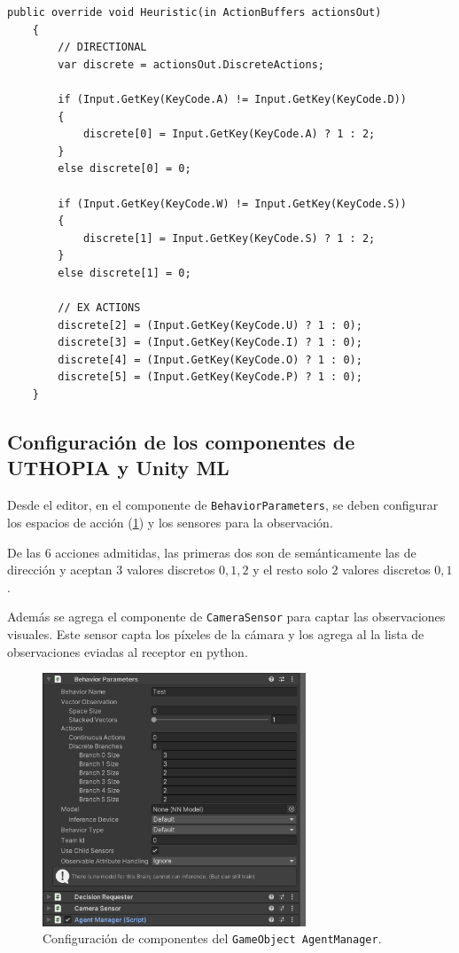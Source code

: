 \begin{lstlisting}[caption={Implementación de la asignación de acciones heurística para captar la entrada de los agentes humanos.}]
    public override void Heuristic(in ActionBuffers actionsOut)
    {
        // DIRECTIONAL
        var discrete = actionsOut.DiscreteActions;
 
        if (Input.GetKey(KeyCode.A) != Input.GetKey(KeyCode.D))
        {
            discrete[0] = Input.GetKey(KeyCode.A) ? 1 : 2;
        }
        else discrete[0] = 0;
 
        if (Input.GetKey(KeyCode.W) != Input.GetKey(KeyCode.S))
        {
            discrete[1] = Input.GetKey(KeyCode.S) ? 1 : 2;
        }
        else discrete[1] = 0;
 
        // EX ACTIONS
        discrete[2] = (Input.GetKey(KeyCode.U) ? 1 : 0);
        discrete[3] = (Input.GetKey(KeyCode.I) ? 1 : 0);
        discrete[4] = (Input.GetKey(KeyCode.O) ? 1 : 0);
        discrete[5] = (Input.GetKey(KeyCode.P) ? 1 : 0);
    }
\end{lstlisting} 
 
\subsection{Configuración de los componentes de UTHOPIA y Unity ML}
 
Desde el editor, en el componente de \lstinline{BehaviorParameters}, se deben configurar los espacios de acción  (\ref{fig:unity-editor-1}) y los sensores para la observación.

De las $6$ acciones admitidas, las primeras dos son de semánticamente las de dirección y aceptan $3$ valores discretos ${{0,1,2}}$ y el resto solo $2$ valores discretos ${{0,1}}$.
 
Además se agrega el componente de \lstinline{CameraSensor} para captar las observaciones visuales. Este sensor capta los píxeles de la cámara y los agrega al la lista de observaciones eviadas al receptor en python. 
 
\begin{figure}[ht!]
    \centering
    \includegraphics[width=0.7\textwidth]{Graphics/unity_editor.png}
    \caption{Configuración de componentes del \lstinline{GameObject AgentManager}.}
    \label{fig:unity-editor-1}
\end{figure}
 
